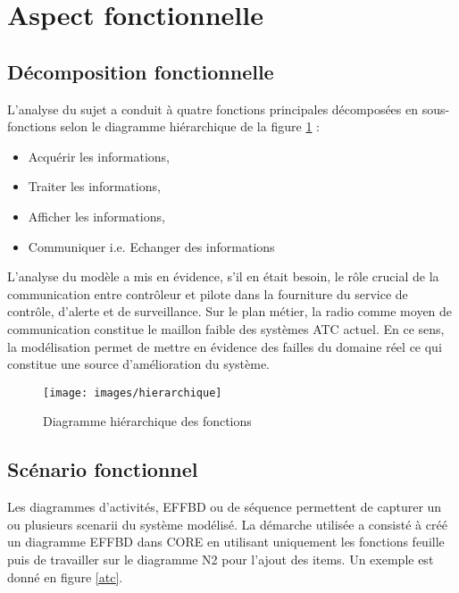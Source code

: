 \section{Aspect fonctionnelle}
	
	\subsection{Décomposition fonctionnelle}
	
	L'analyse du sujet a conduit à quatre fonctions principales décomposées en sous-fonctions selon le diagramme hiérarchique de la figure \ref{hier} :
	
	\begin{itemize}
		\item Acquérir les informations, 
		\item Traiter les informations,
		\item Afficher les informations,
		\item Communiquer i.e. Echanger des informations
	\end{itemize}

L'analyse du modèle a mis en évidence, s'il en était besoin, le rôle crucial
de la communication entre contrôleur et pilote dans la fourniture du service de contrôle, d'alerte et de surveillance. Sur le plan métier, la radio comme moyen de communication constitue le maillon faible des systèmes ATC actuel. En ce sens, la modélisation permet 
de mettre en évidence des failles du domaine réel ce qui constitue une source d'amélioration du système. 
	
	\begin{figure}[H]
		\begin{center}	
			\texttt{[image: images/hierarchique]}
			\caption{Diagramme hiérarchique des fonctions}
			\label{hier}
		\end{center}
	\end{figure}
	
	\subsection{Scénario fonctionnel}

    Les diagrammes d'activités, EFFBD ou de séquence permettent de capturer un ou plusieurs scenarii du système modélisé. La démarche utilisée a consisté à créé un diagramme EFFBD dans CORE en utilisant uniquement les fonctions feuille puis de travailler sur le diagramme N2 pour l'ajout des items. Un exemple est donné en figure \ref{atc}.
    
